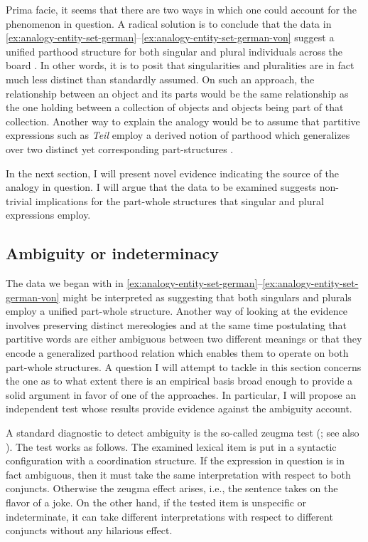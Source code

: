 Prima facie, it seems that there are two ways in which one could account for the phenomenon in question. A radical solution is to conclude that the data in \ref{ex:analogy-entity-set-german}--\ref{ex:analogy-entity-set-german-von} suggest a unified parthood structure for both singular and plural individuals across the board \citep{moltmann1997parts,moltmann1998part}. In other words, it is to posit that singularities and pluralities are in fact much less distinct than standardly assumed. On such an approach, the relationship between an object and its parts would be the same relationship as the one holding between a collection of objects and objects being part of that collection. Another way to explain the analogy would be to assume that partitive expressions such as \textit{Teil} employ a derived notion of parthood which generalizes over two distinct yet corresponding part-structures \citep{barker1998partitives,ionin_matushansky_ruys2006parts}. 

In the next section, I will present novel evidence indicating the source of the analogy in question. I will argue that the data to be examined suggests non-trivial implications for the part-whole structures that singular and plural expressions employ.

\subsection{Ambiguity or indeterminacy}\label{sec:ambiguity-or-indeterminacy}

The data we began with in \ref{ex:analogy-entity-set-german}--\ref{ex:analogy-entity-set-german-von} might be interpreted as suggesting that both singulars and plurals employ a unified part-whole structure. Another way of looking at the evidence involves preserving distinct mereologies and at the same time postulating that partitive words are either ambiguous between two different meanings or that they encode a generalized parthood relation which enables them to operate on both part-whole structures. A question I will attempt to tackle in this section concerns the one as to what extent there is an empirical basis broad enough to provide a solid argument in favor of one of the approaches. In particular, I will propose an independent test whose results provide evidence against the ambiguity account.

A standard diagnostic to detect ambiguity is the so-called zeugma test (\citealt{lasersohn1995plurality}; see also \citealt{zwicky_sadock1975ambiguity}). The test works as follows. The examined lexical item is put in a syntactic configuration with a coordination structure. If the expression in question is in fact ambiguous, then it must take the same interpretation with respect to both conjuncts. Otherwise the zeugma effect arises, i.e., the sentence takes on the flavor of a joke. On the other hand, if the tested item is unspecific or indeterminate, it can take different interpretations with respect to different conjuncts without any hilarious effect.

